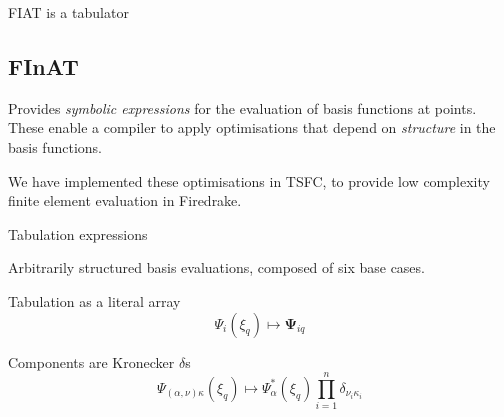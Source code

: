 \documentclass[cmyk,luatex,a0paper,portrait]{baposter}
\begin{document}
\begin{poster}
\begin{posterbox}[name=introduction,span=6,column=0,row=0]{FIAT is a
      tabulator}
\begin{minipage}[t]{0.49\textwidth}
      \subsection*{FInAT}
      \vspace{-0.25\baselineskip}
      Provides \emph{symbolic expressions} for the evaluation of
      basis functions at points.  These enable a compiler to apply
      optimisations that depend on \emph{structure} in the basis
      functions.

      We have implemented these optimisations in TSFC, to provide
      low complexity finite element evaluation in Firedrake.
    \end{minipage}
  \end{posterbox}

  \begin{posterbox}[name=structure, column=0, below=introduction,
    span=3, height=0.275,
    ]{Tabulation expressions}
    \raggedright
    Arbitrarily structured basis evaluations, composed of six base cases.
    \begin{tcbraster}[raster columns=6,raster equal height=rows]
      \begin{tcolorbox}[title=FIAT, raster multicolumn=3,
        height=2.25cm]
        Tabulation as a literal array
        \tcblower
        \vspace{-0.5\baselineskip}
        \begin{equation*}
          \Psi_i(\xi_q) \mapsto \mathbf{\Psi}_{iq}
        \end{equation*}
      \end{tcolorbox}
      \begin{tcolorbox}[title=Tensor-valued, raster multicolumn=3, height=2.25cm]
        Components are Kronecker $\delta$s
        \tcblower
        \vspace{-0.91\baselineskip}
        \begin{equation*}
          \Psi_{(\alpha, \nu)\kappa}(\xi_q) \mapsto \Psi_{\alpha}^*(\xi_q){\prod_{i=1}^n \delta_{\nu_i \kappa_i}}
        \end{equation*}
      \end{tcolorbox}

\end{tcbraster}
\end{posterbox}
\end{poster}
\end{document}
